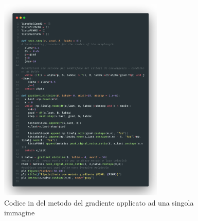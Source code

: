 \begin{figure}[H]
    \centering
    \includegraphics[width=0.7\textwidth]{imgCode/metGrad.png}
    \caption{Codice in  del metodo del gradiente applicato ad una singola immagine}
\end{figure}
